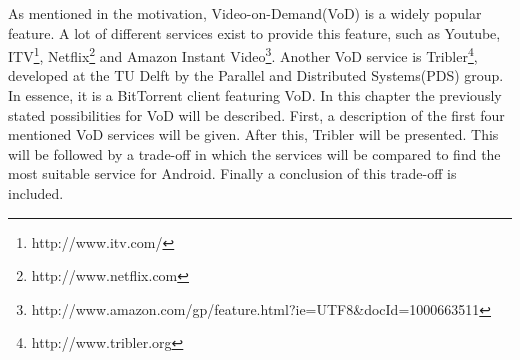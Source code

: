 As mentioned in the motivation, Video-on-Demand(VoD) is a widely popular feature. A lot of different services exist to provide this feature, such as Youtube, ITV\footnote{http://www.itv.com/}, Netflix\footnote{http://www.netflix.com} and Amazon Instant Video\footnote{http://www.amazon.com/gp/feature.html?ie=UTF8\&docId=1000663511}. Another VoD service is Tribler\footnote{http://www.tribler.org}, developed at the TU Delft by the Parallel and Distributed Systems(PDS) group. In essence, it is a BitTorrent client featuring VoD. In this chapter the previously stated possibilities for VoD will be described. First, a description of the first four mentioned VoD services will be given. After this, Tribler will be presented. This will be followed by a trade-off in which the services will be compared to find the most suitable service for Android. Finally a conclusion of this trade-off is included.